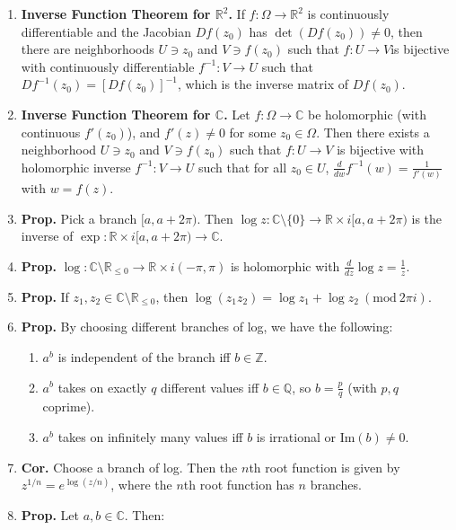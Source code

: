 \documentclass[10pt]{article}
\theoremstyle{definition}
\theoremstyle{named}
\newcommand{\Mod}[1]{\ (\mathrm{mod}\ #1)}
\begin{document}
\begin{enumerate}
\begin{enumerate}
    \end{enumerate}
    \item \textbf{Inverse Function Theorem for $\mathbb{R}^2$. } If $f: \Omega \to \mathbb{R}^2$ is continuously differentiable and the Jacobian $Df(z_0)$ has $\det(Df(z_0)) \neq 0$, then there are neighborhoods $U \ni z_0$ and $V \ni f(z_0)$ such that $f: U \to V$is bijective with continuously differentiable $f^{-1}: V \to U$ such that $Df^{-1}(z_0) = [Df(z_0)]^{-1}$, which is the inverse matrix of $Df(z_0)$. 
    \item \textbf{Inverse Function Theorem for $\mathbb{C}$. } Let $f: \Omega \to \mathbb{C}$ be holomorphic (with continuous $f'(z_0)$), and $f'(z) \neq 0$ for some $z_0 \in \Omega$. Then there exists a neighborhood $U \ni z_0$ and $V \ni f(z_0)$ such that $f: U \to V$ is bijective with holomorphic inverse $f^{-1}: V \to U$ such that for all $z_0 \in U$, $\frac{d}{dw} f^{-1}(w) = \frac{1}{f'(w)}$ with $w = f(z)$. 
    \item \textbf{Prop. } Pick a branch $[a, a+2\pi)$. Then $\log z: \mathbb{C} \setminus \{0\} \to \mathbb{R} \times i[a, a + 2\pi)$ is the inverse of $\exp: \mathbb{R} \times i[a, a+2\pi) \to \mathbb{C}$. 
    \item \textbf{Prop. } $\log: \mathbb{C} \setminus \mathbb{R}_{\leq 0} \to \mathbb{R} \times i(-\pi,\pi)$ is holomorphic with $\frac{d}{dz} \log z = \frac{1}{z}$. 
    \item \textbf{Prop. } If $z_1,z_2 \in \mathbb{C} \setminus \mathbb{R}_{\leq 0}$, then $\log(z_1z_2) = \log z_1 + \log z_2 \Mod{2\pi i}$. 
    \item \textbf{Prop. } By choosing different branches of log, we have the following: 
    \begin{enumerate}
        \item $a^b$ is independent of the branch iff $b \in \mathbb{Z}$. 
        \item $a^b$ takes on exactly $q$ different values iff $b \in \mathbb{Q}$, so $b = \frac{p}{q}$ (with $p,q$ coprime). 
        \item $a^b$ takes on infinitely many values iff $b$ is irrational or $\textrm{Im}(b) \neq 0$. 
    \end{enumerate}
    \item \textbf{Cor. } Choose a branch of log. Then the $n$th root function is given by $z^{1/n} = e^{\log (z/n)}$, where the $n$th root function has $n$ branches. 
    \item \textbf{Prop. } Let $a,b \in \mathbb{C}$. Then: 
    \begin{enumerate}

\end{enumerate}
\end{enumerate}
\end{document}

